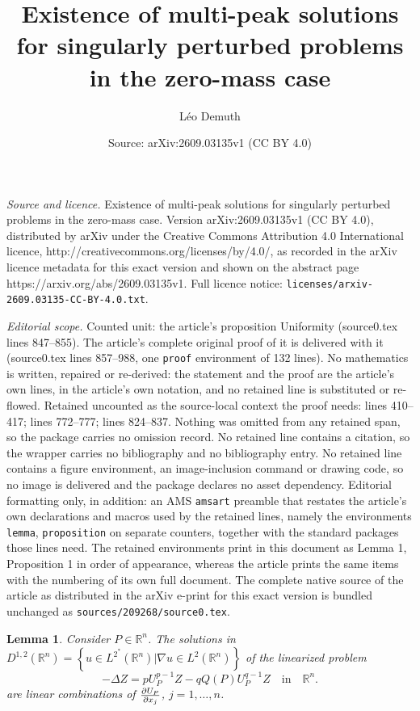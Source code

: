\documentclass[10pt,a4paper]{amsart}
\title{Existence of multi-peak solutions for singularly perturbed problems in the zero-mass case}
\author{L\'eo Demuth}
\date{Source: arXiv:2609.03135v1 (CC BY 4.0)}
\newtheorem{lemma}{Lemma}
\begin{document}
\maketitle

\noindent\emph{Source and licence.} Existence of multi-peak solutions for singularly perturbed problems in the zero-mass case. Version arXiv:2609.03135v1 (CC BY 4.0), distributed by arXiv under the Creative Commons Attribution 4.0 International licence, http://creativecommons.org/licenses/by/4.0/, as recorded in the arXiv licence metadata for this exact version and shown on the abstract page https://arxiv.org/abs/2609.03135v1. Full licence notice: \texttt{licenses/arxiv-2609.03135-CC-BY-4.0.txt}.\par\smallskip

\noindent\textit{Editorial scope.} Counted unit: the article's proposition Uniformity (source0.tex lines 847--855). The article's complete original proof of it is delivered with it (source0.tex lines 857--988, one \texttt{proof} environment of 132 lines). No mathematics is written, repaired or re-derived: the statement and the proof are the article's own lines, in the article's own notation, and no retained line is substituted or re-flowed.  Retained uncounted as the source-local context the proof needs: lines 410--417; lines 772--777; lines 824--837.  Nothing was omitted from any retained span, so the package carries no omission record.  No retained line contains a citation, so the wrapper carries no bibliography and no bibliography entry.  No retained line contains a figure environment, an image-inclusion command or drawing code, so no image is delivered and the package declares no asset dependency.  Editorial formatting only, in addition: an AMS \texttt{amsart} preamble that restates the article's own declarations and macros used by the retained lines, namely the environments \texttt{lemma}, \texttt{proposition} on separate counters, together with the standard packages those lines need.  The retained environments print in this document as Lemma 1, Proposition 1 in order of appearance, whereas the article prints the same items with the numbering of its own full document.  The complete native source of the article as distributed in the arXiv e-print for this exact version is bundled unchanged as \texttt{sources/209268/source0.tex}.
\begin{lemma}\label{non-degeneracy of the solution}
Consider $P\in \mathbb{R}^n$. The solutions in $D^{1,2}(\mathbb{R}^n)=\left\{u \in L^{2^*}(\mathbb{R}^n) | \nabla u \in L^2(\mathbb{R}^n) \right \}$ of the linearized problem 
\begin{equation*}\label{linear} 
   -\Delta Z=pU_P^{p-1}Z-qQ(P)U_P^{q-1}Z\quad  \text{in} \quad \mathbb{R}^n.
\end{equation*} 
are linear combinations of 
$\partial U_P\over\partial x_j$,  $j=1,\dots,n$. 
\end{lemma}
\end{document}
